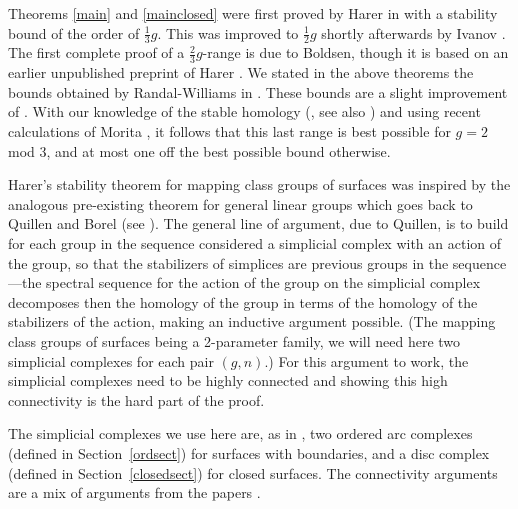 \documentclass[10pt]{amsart}
\begin{document}
Theorems \ref{main} and \ref{mainclosed} were first proved by Harer in \cite{Har85} with a stability bound
of the order of $\frac{1}{3}g$. This was improved to $\frac{1}{2}g$ shortly afterwards
by Ivanov \cite{Iva87,Iva89,Iva93}.  The first complete proof of a 
$\frac{2}{3}g$-range is due to Boldsen, though it is 
based on an earlier unpublished preprint of Harer \cite{Bol09,Har93}. 
We stated in the above theorems the bounds obtained by Randal-Williams in \cite{RW09}. These bounds are a slight
improvement of \cite{Bol09}. With our
knowledge of the stable homology (\cite{Miller,Mor87}, see also \cite{MadWei}) and using recent calculations of Morita 
\cite[Thm.~1.1]{Mor03},  
it follows that this last range is best possible for $g=2$ mod 3, and at most one off the best possible bound otherwise. 

\smallskip

Harer's stability theorem for mapping class groups of surfaces was inspired by the analogous pre-existing theorem
for general linear groups which goes back to Quillen and Borel (see \cite{Bor74,vdK}). 
The general line of argument, due to Quillen,   
is to build for each group in the sequence considered a simplicial complex
with an action of the group, so that the stabilizers of simplices are previous groups in the sequence---the spectral
sequence for the action of the group on the simplicial complex decomposes then the homology of the group in terms of the
homology of the stabilizers of the action, making an inductive argument possible. (The mapping class
groups of surfaces being a 2-parameter family, we will need here two simplicial complexes for each pair $(g,n)$.) 
For this argument to work, the simplicial complexes need to be highly connected and showing this 
high connectivity is the hard part of the proof. 

The simplicial complexes we use here are, as in \cite{RW09}, two ordered arc complexes (defined in Section~\ref{ordsect}) 
for surfaces
with boundaries, and a disc complex (defined in Section~\ref{closedsect}) for closed surfaces. 
The connectivity arguments are a mix of arguments from the papers 
\cite{Har85,Hat91,Iva89,RW09,Wahl08}.


\medskip
\end{document}
